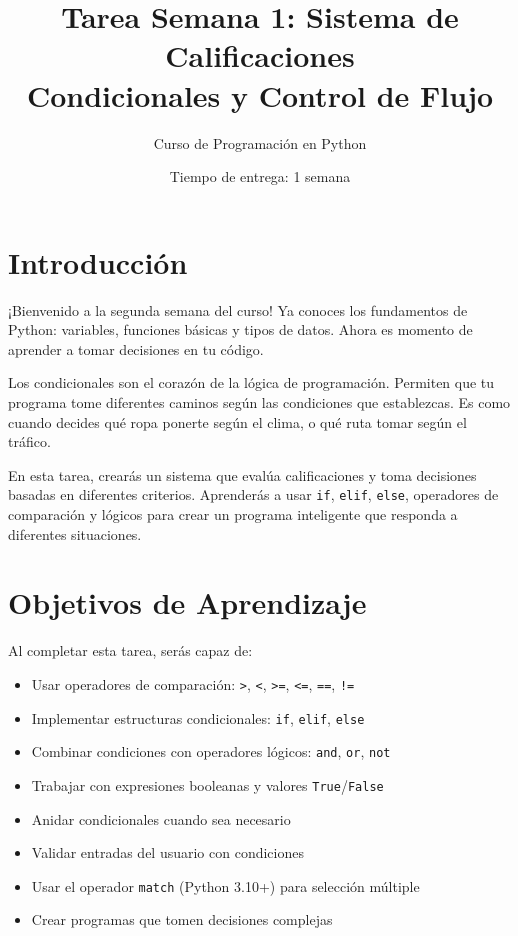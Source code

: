 \documentclass[12pt,a4paper]{article}
\title{\textbf{Tarea Semana 1: Sistema de Calificaciones}\\
\large Condicionales y Control de Flujo}
\author{Curso de Programación en Python}
\date{Tiempo de entrega: 1 semana}
\begin{document}
\maketitle

\section{Introducción}

¡Bienvenido a la segunda semana del curso! Ya conoces los fundamentos de Python: variables, funciones básicas y tipos de datos. Ahora es momento de aprender a tomar decisiones en tu código.

Los condicionales son el corazón de la lógica de programación. Permiten que tu programa tome diferentes caminos según las condiciones que establezcas. Es como cuando decides qué ropa ponerte según el clima, o qué ruta tomar según el tráfico.

En esta tarea, crearás un sistema que evalúa calificaciones y toma decisiones basadas en diferentes criterios. Aprenderás a usar \texttt{if}, \texttt{elif}, \texttt{else}, operadores de comparación y lógicos para crear un programa inteligente que responda a diferentes situaciones.

\section{Objetivos de Aprendizaje}

Al completar esta tarea, serás capaz de:

\begin{itemize}[leftmargin=*]
    \item Usar operadores de comparación: \texttt{>}, \texttt{<}, \texttt{>=}, \texttt{<=}, \texttt{==}, \texttt{!=}
    \item Implementar estructuras condicionales: \texttt{if}, \texttt{elif}, \texttt{else}
    \item Combinar condiciones con operadores lógicos: \texttt{and}, \texttt{or}, \texttt{not}
    \item Trabajar con expresiones booleanas y valores \texttt{True}/\texttt{False}
    \item Anidar condicionales cuando sea necesario
    \item Validar entradas del usuario con condiciones
    \item Usar el operador \texttt{match} (Python 3.10+) para selección múltiple
    \item Crear programas que tomen decisiones complejas
\end{itemize}
\end{document}
